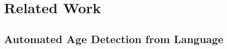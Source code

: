 \section{Related Work}
\label{sec:related_work}


\subsection{Automated Age Detection from Language}



